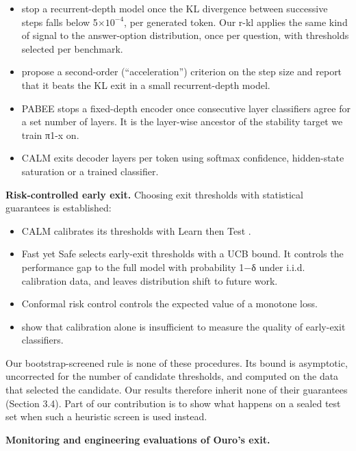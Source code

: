 \begin{itemize}
\tightlist
\item
  \citet{Geiping2025} stop a recurrent-depth model once the KL divergence between successive steps falls below 5\(\times 10^{-4}\), per
  generated token. Our r-kl applies the same kind of signal to the answer-option distribution, once per question, with thresholds selected
  per benchmark.
\item
  \citet{Pappone2025} propose a second-order (``acceleration'') criterion on the step size and report that it beats the KL exit in a
  small recurrent-depth model.
\item
  PABEE \citep{Zhou2020} stops a fixed-depth encoder once consecutive layer classifiers agree for a set number of layers. It is the layer-wise
  ancestor of the stability target we train π1-x on.
\item
  CALM \citep{Schuster2022} exits decoder layers per token using softmax confidence, hidden-state saturation or a trained classifier.
\end{itemize}

\textbf{Risk-controlled early exit.} Choosing exit thresholds with statistical guarantees is established:

\begin{itemize}
\tightlist
\item
  CALM calibrates its thresholds with Learn then Test \citep{Schuster2022,Angelopoulos2025LTT}.
\item
  Fast yet Safe \citep{Jazbec2024} selects early-exit thresholds with a UCB bound. It controls the performance gap to the full model with
  probability 1−δ under i.i.d. calibration data, and leaves distribution shift to future work.
\item
  Conformal risk control \citep{Angelopoulos2024CRC} controls the expected value of a monotone loss.
\item
  \citet{Kubaty2026} show that calibration alone is insufficient to measure the quality of early-exit classifiers.
\end{itemize}

Our bootstrap-screened rule is none of these procedures. Its bound is asymptotic, uncorrected for the number of candidate thresholds, and
computed on the data that selected the candidate. Our results therefore inherit none of their guarantees (Section 3.4). Part of our
contribution is to show what happens on a sealed test set when such a heuristic screen is used instead.

\textbf{Monitoring and engineering evaluations of Ouro's exit.}

